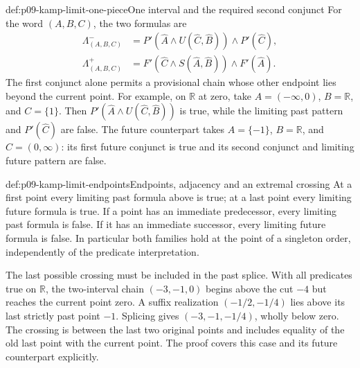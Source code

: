 \begin{hbexample}{def:p09-kamp-limit-one-piece}{One interval and the required second conjunct}
For the word \((A,B,C)\), the two formulas are
\[
\begin{aligned}
 \Lambda^-_{(A,B,C)}
   &=P'(\widehat A\land U(\widehat C,\widehat B))
                                      \land P'(\widehat C),\\
 \Lambda^+_{(A,B,C)}
   &=F'(\widehat C\land S(\widehat A,\widehat B))
                                      \land F'(\widehat A).
\end{aligned}
\]
The first conjunct alone permits a provisional chain whose other endpoint
lies beyond the current point.  For example, on \(\mathbb R\) at zero,
take \(A=(-\infty,0)\), \(B=\mathbb R\), and \(C=\{1\}\).
Then \(P'(\widehat A\land U(\widehat C,\widehat B))\) is true, while
the limiting past pattern and \(P'(\widehat C)\) are false.
The future counterpart takes \(A=\{-1\}\), \(B=\mathbb R\), and
\(C=(0,\infty)\): its first future conjunct is true and its second
conjunct and limiting future pattern are false.
\end{hbexample}

\begin{hbexample}{def:p09-kamp-limit-endpoints}{Endpoints, adjacency and an extremal crossing}
At a first point every limiting past formula above is true; at a last point
every limiting future formula is true.  If a point has an immediate
predecessor, every limiting past formula is false.  If it has an immediate
successor, every limiting future formula is false.  In particular both
families hold at the point of a singleton order, independently of the
predicate interpretation.

The last possible crossing must be included in the past splice.  With all
predicates true on \(\mathbb R\), the two-interval chain
\((-3,-1,0)\) begins above the cut \(-4\) but reaches the current point
zero.  A suffix realization \((-1/2,-1/4)\) lies above its last strictly
past point \(-1\).  Splicing gives \((-3,-1,-1/4)\), wholly below zero.
The crossing is between the last two original points and includes equality
of the old last point with the current point.  The proof covers this case
and its future counterpart explicitly.
\end{hbexample}

